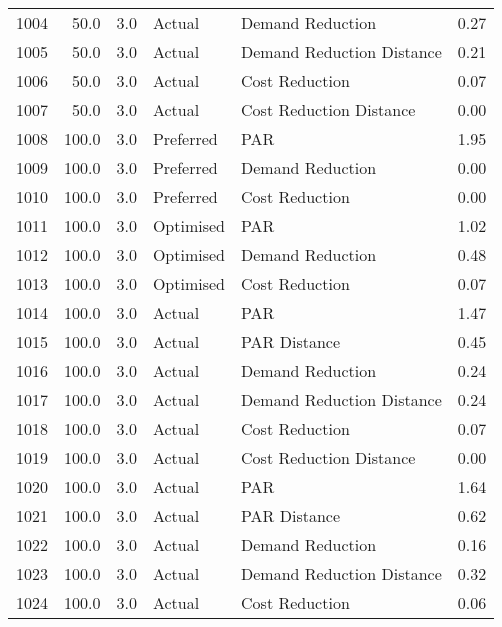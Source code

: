 \begin{longtable}{lrrllr}
1004 &         50.0 &     3.0 &         Actual &           Demand Reduction &   0.27 \\
1005 &         50.0 &     3.0 &         Actual &  Demand Reduction Distance &   0.21 \\
1006 &         50.0 &     3.0 &         Actual &             Cost Reduction &   0.07 \\
1007 &         50.0 &     3.0 &         Actual &    Cost Reduction Distance &   0.00 \\
1008 &        100.0 &     3.0 &      Preferred &                        PAR &   1.95 \\
1009 &        100.0 &     3.0 &      Preferred &           Demand Reduction &   0.00 \\
1010 &        100.0 &     3.0 &      Preferred &             Cost Reduction &   0.00 \\
1011 &        100.0 &     3.0 &      Optimised &                        PAR &   1.02 \\
1012 &        100.0 &     3.0 &      Optimised &           Demand Reduction &   0.48 \\
1013 &        100.0 &     3.0 &      Optimised &             Cost Reduction &   0.07 \\
1014 &        100.0 &     3.0 &         Actual &                        PAR &   1.47 \\
1015 &        100.0 &     3.0 &         Actual &               PAR Distance &   0.45 \\
1016 &        100.0 &     3.0 &         Actual &           Demand Reduction &   0.24 \\
1017 &        100.0 &     3.0 &         Actual &  Demand Reduction Distance &   0.24 \\
1018 &        100.0 &     3.0 &         Actual &             Cost Reduction &   0.07 \\
1019 &        100.0 &     3.0 &         Actual &    Cost Reduction Distance &   0.00 \\
1020 &        100.0 &     3.0 &         Actual &                        PAR &   1.64 \\
1021 &        100.0 &     3.0 &         Actual &               PAR Distance &   0.62 \\
1022 &        100.0 &     3.0 &         Actual &           Demand Reduction &   0.16 \\
1023 &        100.0 &     3.0 &         Actual &  Demand Reduction Distance &   0.32 \\
1024 &        100.0 &     3.0 &         Actual &             Cost Reduction &   0.06 \\

\end{longtable}
